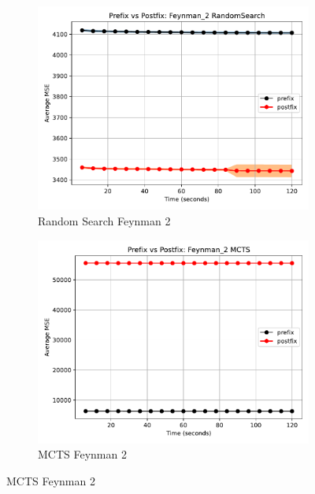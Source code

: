 \documentclass[runningheads]{llncs}
\begin{document}
\begin{figure}
    \centering
    
    \begin{subfigure}[b]{0.4\textwidth}
        \includegraphics[width=\linewidth, keepaspectratio]{AIFeynman_Benchmarks/PrePostFeynman_2RandomSearch.pdf}
        \caption{Random Search Feynman 2}
        \label{subfig:feynman_2_RS}
    \end{subfigure}
    \begin{subfigure}[b]{0.4\textwidth}
        \includegraphics[width=\linewidth, keepaspectratio]{AIFeynman_Benchmarks/PrePostFeynman_2MCTS.pdf}
        \caption{MCTS Feynman 2}
        \label{subfig:feynman_2_MCTS}
    \end{subfigure}
    

\end{figure}
\end{document}
